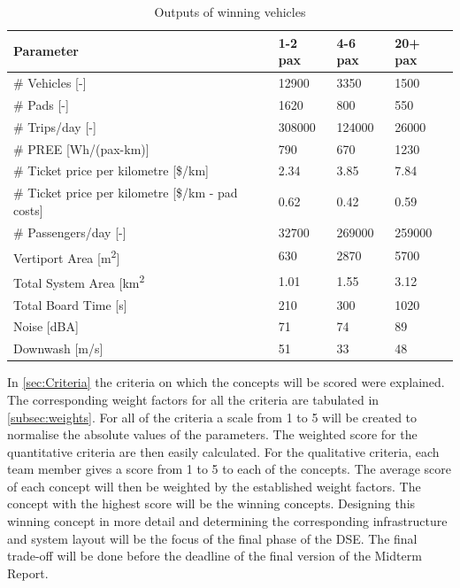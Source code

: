 \begin{table}[H]
\captionsetup{justification=centering}
\caption{Outputs of winning vehicles}
\label{outputswin}
\begin{tabular}{llll}
\hline
\textbf{Parameter}                          & \textbf{1-2 pax} & \textbf{4-6 pax} & \textbf{20+ pax} \\ \hline
\# Vehicles {[}-{]}                         & 12900             &     3350             & 1500             \\
\# Pads {[}-{]}                             & 1620             &        800          & 550              \\
\# Trips/day {[}-{]}                        & 308000           &       124000           & 26000            \\
\# PREE {[}Wh/(pax-km){]}                   & 790           &        670          & 1230           \\
\# Ticket price per kilometre {[}\$/km{]} & 2.34             &    3.85              & 7.84             \\
\# Ticket price per kilometre {[}\$/km - pad costs{]} & 0.62             &    0.42              & 0.59             \\
\# Passengers/day {[}-{]}                   & 32700           &     269000             & 259000           \\
Vertiport Area {[}m\textsuperscript{2}{]}   & 630            &     2870             & 5700             \\
Total System Area {[}km\textsuperscript{2}  & 1.01          &       1.55           & 3.12          \\
Total Board Time {[}s{]}                    & 210              &        300          & 1020             \\
Noise {[}dBA{]}                             & 71             &       74           & 89             \\ 
Downwash [m/s]                              & 51            &       33              &   48      \\ \hline
\end{tabular}
\end{table}

In \autoref{sec:Criteria} the criteria on which the concepts will be scored were explained. The corresponding weight factors for all the criteria are tabulated in \autoref{subsec:weights}. For all of the criteria a scale from 1 to 5 will be created to normalise the absolute values of the parameters. The weighted score for the quantitative criteria are then easily calculated. For the qualitative criteria, each team member gives a score from 1 to 5 to each of the concepts. The average score of each concept will then be weighted by the established weight factors. The concept with the highest score will be the winning concepts. Designing this winning concept in more detail and determining the corresponding infrastructure and system layout will be the focus of the final phase of the DSE. The final trade-off will be done before the deadline of the final version of the Midterm Report. 

